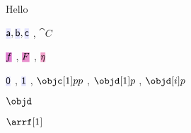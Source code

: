 \documentclass[10pt,a4paper]{article}
\begin{document}
Hello

$\obj a,\obj b,\obj c$ , $\cat C$

$\arr f$ , $\fct F$ , $\ntf \eta$

$\obj0$ , $\obj1$ , $\objc[1]pp$ , $\objd[1]p$ , $\objd[i]p$ 

$\objd$

$\arrf[1]$
\end{document}
